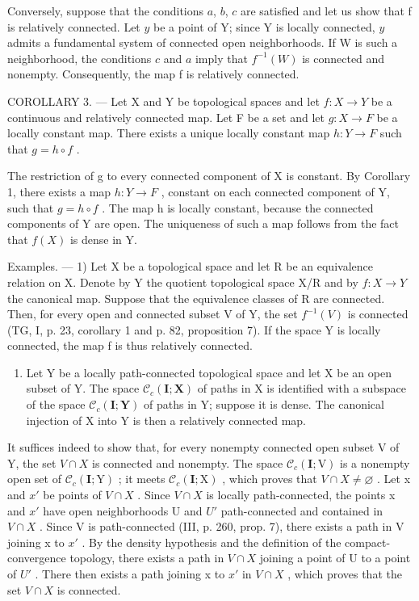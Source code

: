 Conversely, suppose that the conditions \(a\), \(b\), \(c\) are satisfied and let us show that f is relatively connected. Let \(y\) be a point of Y; since Y is locally connected, \(y\) admits a fundamental system of connected open neighborhoods. If W is such a neighborhood, the conditions \(c\) and \(a\) imply that \(f^{-1}(W)\) is connected and nonempty. Consequently, the map f is relatively connected.

COROLLARY 3. --- Let X and Y be topological spaces and let \(f\colon X\to Y\) be a continuous and relatively connected map. Let F be a set and let \(g\colon X\to F\) be a locally constant map. There exists a unique locally constant map \(h\colon Y\to F\) such that \(g=h\circ f\) .

The restriction of g to every connected component of X is constant. By Corollary 1, there exists a map \(h: Y \to F\) , constant on each connected component of Y, such that \(g = h \circ f\) . The map h is locally constant, because the connected components of Y are open. The uniqueness of such a map follows from the fact that \(f(X)\) is dense in Y.

Examples. --- 1) Let X be a topological space and let R be an equivalence relation on X. Denote by Y the quotient topological space X/R and by \(f\colon X \to Y\) the canonical map. Suppose that the equivalence classes of R are connected. Then, for every open and connected subset V of Y, the set \(f^{-1}(V)\) is connected (TG, I, p. 23, corollary 1 and p. 82, proposition 7). If the space Y is locally connected, the map f is thus relatively connected.

\begin{enumerate}
\def\labelenumi{\arabic{enumi})}
\setcounter{enumi}{1}
\tightlist
\item
  Let Y be a locally path-connected topological space and let X be an open subset of Y. The space \(\mathcal{C}_{c}(\mathbf{I};\mathbf{X})\) of paths in X is identified with a subspace of the space \(\mathcal{C}_{c}(\mathbf{I};\mathbf{Y})\) of paths in Y; suppose it is dense. The canonical injection of X into Y is then a relatively connected map.
\end{enumerate}

It suffices indeed to show that, for every nonempty connected open subset V of Y, the set \(V \cap X\) is connected and nonempty. The space \(\mathcal{C}_{c}(\mathbf{I};\mathrm{V})\) is a nonempty open set of \(\mathcal{C}_{c}(\mathbf{I};\mathrm{Y})\) ; it meets \(\mathcal{C}_{c}(\mathbf{I};\mathrm{X})\) , which proves that \(V \cap X \neq \varnothing\) . Let x and \(x'\) be points of \(V \cap X\) . Since \(V \cap X\) is locally path-connected, the points x and \(x'\) have open neighborhoods U and \(U'\) path-connected and contained in \(V \cap X\) . Since V is path-connected (III, p. 260, prop. 7), there exists a path in V joining x to \(x'\) . By the density hypothesis and the definition of the compact-convergence topology, there exists a path in \(V \cap X\) joining a point of U to a point of \(U'\) . There then exists a path joining x to \(x'\) in \(V \cap X\) , which proves that the set \(V \cap X\) is connected.


